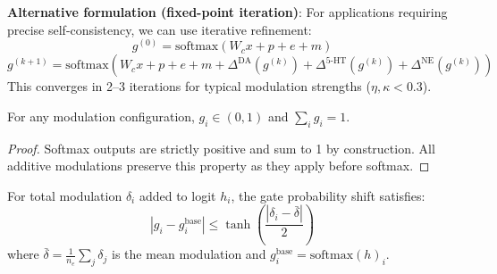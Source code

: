 \documentclass[preprint,12pt]{elsarticle}
\begin{document}
\textbf{Alternative formulation (fixed-point iteration)}: For applications requiring precise self-consistency, we can use iterative refinement:
\begin{equation}
g^{(0)} = \text{softmax}(W_c x + p + e + m)
\end{equation}
\begin{equation}
g^{(k+1)} = \text{softmax}(W_c x + p + e + m + \Delta^{\text{DA}}(g^{(k)}) + \Delta^{\text{5-HT}}(g^{(k)}) + \Delta^{\text{NE}}(g^{(k)}))
\end{equation}
This converges in 2--3 iterations for typical modulation strengths ($\eta, \kappa < 0.3$).

\begin{lemma}
For any modulation configuration, $g_i \in (0, 1)$ and $\sum_i g_i = 1$.
\end{lemma}

\begin{proof}
Softmax outputs are strictly positive and sum to 1 by construction. All additive modulations preserve this property as they apply before softmax.
\end{proof}

\begin{lemma}
For total modulation $\delta_i$ added to logit $h_i$, the gate probability shift satisfies:
\begin{equation}
|g_i - g_i^{\text{base}}| \leq \tanh\left(\frac{|\delta_i - \bar{\delta}|}{2}\right)
\end{equation}
where $\bar{\delta} = \frac{1}{n_e}\sum_j \delta_j$ is the mean modulation and $g_i^{\text{base}} = \text{softmax}(h)_i$.
\end{lemma}
\end{document}
